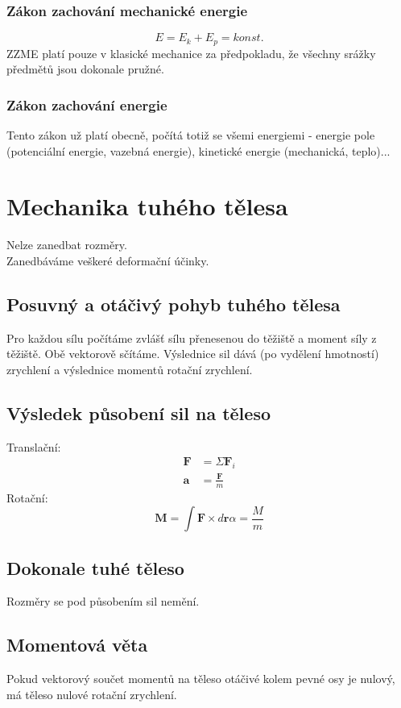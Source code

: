 \documentclass[titlepage]{book}
\begin{document}
\subsection{Zákon zachování mechanické energie}
\begin{equation}
E = E_k + E_p = konst.
\end{equation}
ZZME platí pouze v klasické mechanice za předpokladu, že všechny srážky předmětů jsou dokonale pružné.
\subsection{Zákon zachování energie}
Tento zákon už platí obecně, počítá totiž se všemi energiemi - energie pole (potenciální energie, vazebná energie), kinetické energie (mechanická, teplo)...
\chapter{Mechanika tuhého tělesa}
Nelze zanedbat rozměry.\\
Zanedbáváme veškeré deformační účinky.
\section{Posuvný a otáčivý pohyb tuhého tělesa}
Pro každou sílu počítáme zvlášť sílu přenesenou do těžiště a moment síly z těžiště. Obě vektorově sčítáme. Výslednice sil dává (po vydělení hmotností) zrychlení a výslednice momentů rotační zrychlení.
\section{Výsledek působení sil na těleso}
Translační:
\begin{align}
\boldsymbol F &= \Sigma \boldsymbol F_i\\
\boldsymbol a &= \frac{\boldsymbol F}{m}
\end{align}
Rotační:
\begin{equation}
\boldsymbol M = \int \boldsymbol F \times d\boldsymbol r
\alpha = \frac{M}{m}
\end{equation}
\section{Dokonale tuhé těleso}
Rozměry se pod působením sil nemění.
\section{Momentová věta}
Pokud vektorový součet momentů na těleso otáčivé kolem pevné osy je nulový, má těleso nulové rotační zrychlení.
\end{document}
